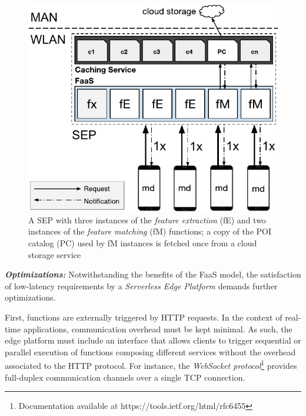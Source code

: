 \begin{figure}[tbp]
	\centering
	\includegraphics[width=0.97\linewidth]{Figs/Mobile_Computation_Offloading_Caching.pdf}
	\caption{A SEP with three instances of the \textit{feature extraction} (fE) and two instances of the \textit{feature matching} (fM) functions; a copy of the POI catalog (PC) used by fM instances is fetched once from a cloud storage service} 
	\label{fig:Mobile_Computation_Offloading_Caching}
\end{figure}



\textbf{\textit{Optimizations:}} Notwithstanding the benefits of the FaaS model,
the satisfaction of low-latency requirements by a \textit{Serverless Edge Platform} demands further optimizations.

First, functions are externally triggered by HTTP requests. In the context of real-time applications, communication overhead must be kept minimal. As such, the edge platform must include an interface that allows clients to trigger sequential or parallel execution of functions composing different services without the overhead associated to the HTTP protocol. For instance, the \textit{WebSocket protocol}\footnote{Documentation available at https://tools.ietf.org/html/rfc6455}
provides full-duplex communication channels over a single TCP connection. %

